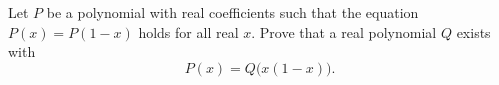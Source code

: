 Let $P$ be a polynomial with real coefficients such that the equation $P(x)=P(1-x)$ holds
for all real $x$. Prove that a real polynomial $Q$ exists with
$$P(x)=Q\big(x(1-x)\big).$$